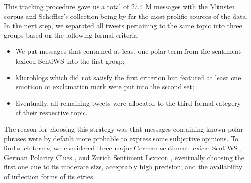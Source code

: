 




This tracking procedure gave us a total of 27.4 M messages with the
M\"unster corpus and Scheffler's collection being by far the most
prolific sources of the data.  In the next step, we separated all
tweets pertaining to the same topic into three groups based on the
following formal criteria:
\begin{itemize}
\item We put messages that contained at least one polar term from the
  sentiment lexicon SentiWS \cite{Remus:10} into the first group;
\item Microblogs which did not satisfy the first criterion but
  featured at least one emoticon or exclamation mark were put into the
  second set;
\item Eventually, all remaining tweets were allocated to the third
  formal category of their respective topic.
\end{itemize}
The reason for choosing this strategy was that messages containing
known polar phrases were by default more probable to express some
subjective opinions.  To find such terms, we considered three major
German sentiment lexica: SentiWS \cite{Remus:10}, German Polarity
Clues \cite{Waltinger:10}, and Zurich Sentiment Lexicon
\cite{Clematide:10}, eventually choosing the first one due to its
moderate size, acceptably high precision, and the availability of
inflection forms of its etries.

